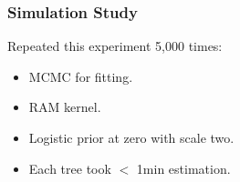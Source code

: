 \documentclass[aspectratio=169,9pt,handout]{beamer}
\begin{document}
\begin{frame}
	\frametitle{Simulation Study}
	
	\begin{minipage}[c]{.40\linewidth}
		Repeated this experiment 5,000 times:
		\begin{itemize}
			\item MCMC for fitting.
			\item RAM kernel.
			\item Logistic prior at zero with scale two.
			\item Each tree took $<$ 1min estimation.
		\end{itemize}
	\end{minipage}\hfill
	\begin{minipage}[c]{.59\linewidth}
	\end{minipage}
	
\end{frame}
\end{document}
